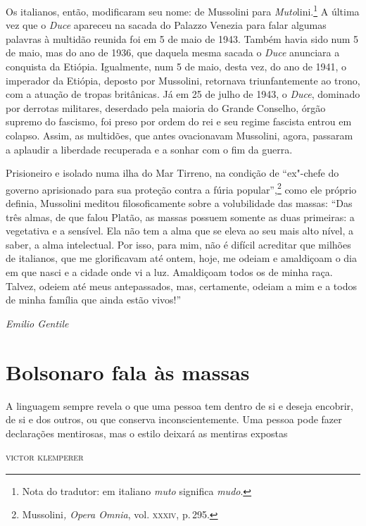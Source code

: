 Os italianos, então, modificaram seu nome: de Mussolini para
\emph{Muto}lini.\footnote{Nota do tradutor: em italiano
  \emph{muto} significa \emph{mudo}.} A última vez que o \emph{Duce}
apareceu na sacada do Palazzo Venezia para falar algumas palavras à
multidão reunida foi em 5 de maio de 1943. Também havia sido num 5 de
maio, mas do ano de 1936, que daquela mesma sacada o \emph{Duce}
anunciara a conquista da Etiópia. Igualmente, num 5 de maio, desta vez,
do ano de 1941, o imperador da Etiópia, deposto por Mussolini, retornava
triunfantemente ao trono, com a atuação de tropas britânicas. Já em 25
de julho de 1943, o \emph{Duce}, dominado por derrotas militares,
deserdado pela maioria do Grande Conselho, órgão supremo do fascismo,
foi preso por ordem do rei e seu regime fascista entrou em colapso.
Assim, as multidões, que antes ovacionavam Mussolini, agora, passaram a
aplaudir a liberdade recuperada e a sonhar com o fim da guerra.

Prisioneiro e isolado numa ilha do Mar Tirreno, na condição de ``ex"-chefe
do governo aprisionado para sua proteção contra a fúria
popular'',\footnote{Mussolini\emph{, Opera Omnia}, vol. \textsc{xxxiv}, p.\,295.}
como ele próprio definia, Mussolini meditou filosoficamente sobre a
volubilidade das massas: ``Das três almas, de que falou Platão, as
massas possuem somente as duas primeiras: a vegetativa e a sensível. Ela
não tem a alma que se eleva ao seu mais alto nível, a saber, a alma
intelectual. Por isso, para mim, não é difícil acreditar que milhões de
italianos, que me glorificavam até ontem, hoje, me odeiam e amaldiçoam o
dia em que nasci e a cidade onde vi a luz. Amaldiçoam todos os de minha
raça. Talvez, odeiem até meus antepassados, mas, certamente, odeiam a
mim e a todos de minha família que ainda estão vivos!''

\bigskip

\begin{flushright}
\textit{Emilio Gentile}
\end{flushright}

\chapter[Bolsonaro fala às massas, \emph{por Carlos Piovezani}]{Bolsonaro fala às massas }

\epigraph{A linguagem sempre revela o que uma pessoa tem dentro de si e
deseja encobrir, de si e dos outros, ou que conserva inconscientemente.
Uma pessoa pode fazer declarações mentirosas, mas o estilo deixará as
mentiras expostas}{\textsc{victor klemperer}}

